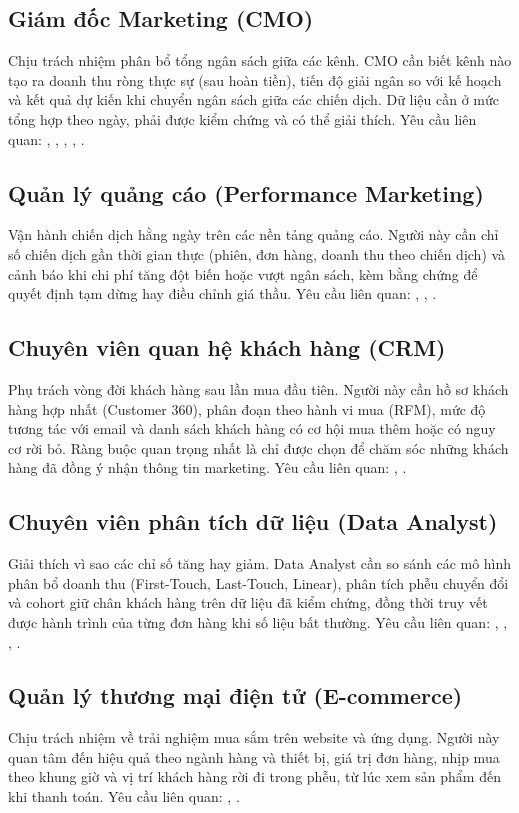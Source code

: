 \subsection{Giám đốc Marketing (CMO)}
\label{sec:c1-sh-cmo}
Chịu trách nhiệm phân bổ tổng ngân sách giữa các kênh. CMO cần biết kênh nào tạo ra doanh thu ròng thực sự (sau hoàn tiền), tiến độ giải ngân so với kế hoạch và kết quả dự kiến khi chuyển ngân sách giữa các chiến dịch. Dữ liệu cần ở mức tổng hợp theo ngày, phải được kiểm chứng và có thể giải thích. Yêu cầu liên quan: , , , , .

\subsection{Quản lý quảng cáo (Performance Marketing)}
\label{sec:c1-sh-performance}
Vận hành chiến dịch hằng ngày trên các nền tảng quảng cáo. Người này cần chỉ số chiến dịch gần thời gian thực (phiên, đơn hàng, doanh thu theo chiến dịch) và cảnh báo khi chi phí tăng đột biến hoặc vượt ngân sách, kèm bằng chứng để quyết định tạm dừng hay điều chỉnh giá thầu. Yêu cầu liên quan: , , .

\subsection{Chuyên viên quan hệ khách hàng (CRM)}
\label{sec:c1-sh-crm}
Phụ trách vòng đời khách hàng sau lần mua đầu tiên. Người này cần hồ sơ khách hàng hợp nhất (Customer 360), phân đoạn theo hành vi mua (RFM), mức độ tương tác với email và danh sách khách hàng có cơ hội mua thêm hoặc có nguy cơ rời bỏ. Ràng buộc quan trọng nhất là chỉ được chọn để chăm sóc những khách hàng đã đồng ý nhận thông tin marketing. Yêu cầu liên quan: , .

\subsection{Chuyên viên phân tích dữ liệu (Data Analyst)}
\label{sec:c1-sh-analyst}
Giải thích vì sao các chỉ số tăng hay giảm. Data Analyst cần so sánh các mô hình phân bổ doanh thu (First-Touch, Last-Touch, Linear), phân tích phễu chuyển đổi và cohort giữ chân khách hàng trên dữ liệu đã kiểm chứng, đồng thời truy vết được hành trình của từng đơn hàng khi số liệu bất thường. Yêu cầu liên quan: , , , .

\subsection{Quản lý thương mại điện tử (E-commerce)}
\label{sec:c1-sh-ecommerce}
Chịu trách nhiệm về trải nghiệm mua sắm trên website và ứng dụng. Người này quan tâm đến hiệu quả theo ngành hàng và thiết bị, giá trị đơn hàng, nhịp mua theo khung giờ và vị trí khách hàng rời đi trong phễu, từ lúc xem sản phẩm đến khi thanh toán. Yêu cầu liên quan: , .

